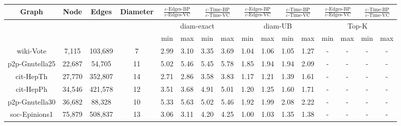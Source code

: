 \begin{table*}[ht]
\centering %
\begin{small}
\begin{tabular}{|c c c c | c c | c c | c c | c c | c c | c c|} %
\hline\hline %
Graph & Node & Edges & Diameter  & \multicolumn{2}{|c|}{$\frac{\varepsilon\mbox{-Edges-BP}}{ \varepsilon\mbox{-Edges-VC}}$} & \multicolumn{2}{c|}{$\frac{\varepsilon\mbox{-Time-BP}}{\varepsilon\mbox{-Time-VC}}$} & \multicolumn{2}{c|}{$\frac{\varepsilon\mbox{-Edges-BP}}{ \varepsilon\mbox{-Edges-VC}}$} & \multicolumn{2}{c|}{$\frac{\varepsilon\mbox{-Time-BP}}{\varepsilon\mbox{-Time-VC}}$} & \multicolumn{2}{c|}{$\frac{\varepsilon\mbox{-Edges-BP}}{ \varepsilon\mbox{-Edges-VC}}$} & \multicolumn{2}{c|}{$\frac{\varepsilon\mbox{-Time-BP}}{\varepsilon\mbox{-Time-VC}}$}\\ [0.5ex] %
\hline
&  &  & &\multicolumn{4}{|c|}{diam-exact}  &  \multicolumn{4}{c|}{diam-UB} & \multicolumn{4}{c|}{Top-K}\\
\hline %
&  &  & &min & max & min & max&min & max & min & max &min & max & min & max\\
\hline %
wiki-Vote & 7,115 & 103,689  & 7 & 2.99 & 3.10 & 3.35 & 3.69 & 1.04 & 1.06 &1.05 & 1.27 & - & - & - & -\\
p2p-Gnutella25 & 22,687 & 54,705 & 11 & 5.02 & 5.46 & 5.45 & 5.78 & 1.85& 1.94& 1.94 & 2.09 & - & - & - &-\\
cit-HepTh & 27,770 & 352,807 & 14  & 2.71 & 2.86 & 3.58 & 3.83 & 1.17 & 1.21 & 1.39 & 1.61 & - & -  & - & -\\
cit-HepPh & 34,546 & 421,578 & 12 & 3.51 & 3.68 & 4.91 & 5.01 & 1.20 & 1.25& 1.60 & 1.71 & - & -  &-  &-\\ %
p2p-Gnutella30 & 36,682 & 88,328 & 10  & 5.33 & 5.63 & 5.02 & 5.46 & 1.92 & 1.99 & 2.08 & 2.22 & - & - & - & -\\
soc-Epinions1 & 75,879 & 508,837 & 13  & 3.06&  3.11 & 4.20 & 4.25 & 1.00 & 1.03 & 1.35 & 1.38 & - &  - & - & -\\ [1ex] %
\hline %
\end{tabular}

\end{small}
\end{table*}
